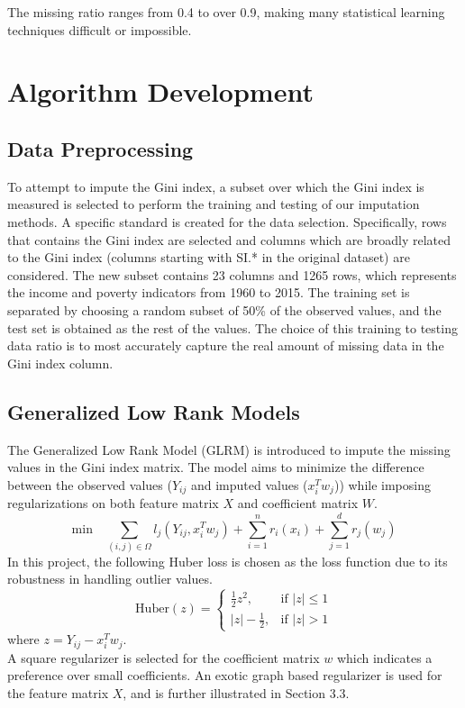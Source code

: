 \documentclass[a4paper]{article}
\begin{document}
The missing ratio ranges from 0.4 to over 0.9, making many statistical learning techniques difficult or impossible.

\section{Algorithm Development}
\subsection{Data Preprocessing}
To attempt to impute the Gini index, a subset over which the Gini index is measured is selected to perform the training and testing of our imputation methods. A specific standard is created for the data selection. Specifically, rows that contains the Gini index are selected and columns which are broadly related to the Gini index (columns starting with SI.* in the original dataset) are considered. The new subset contains 23 columns and 1265 rows, which represents the income and poverty indicators from 1960 to 2015. The training set is separated by choosing a random subset of 50\% of the observed values, and the test set is obtained as the rest of the values. The choice of this training to testing data ratio is to most accurately capture the real amount of missing data in the Gini index column.


\subsection{Generalized Low Rank Models}
The Generalized Low Rank Model (GLRM) is introduced to impute the missing values in the Gini index matrix. The model aims to minimize the difference between the observed values ($Y_{ij}$ and imputed values ($x_i^Tw_j$)) while imposing regularizations on both feature matrix $X$ and coefficient matrix $W$.
\begin{equation*}
\text{min}\quad \sum_{(i,j)\in \Omega}l_j(Y_{ij},x_i^Tw_j)+\sum_{i=1}^nr_i(x_i)+\sum_{j=1}^dr_j(w_j)
\end{equation*}
In this project, the following Huber loss is chosen as the loss function due to its robustness in handling outlier values. 
\begin{equation*}
\text{Huber}(z)=\begin{cases}
\frac{1}{2}z^2,&\text{if $|z|\leq1$}\\
|z|-\frac{1}{2},&\text{if $|z|>1$}
\end{cases}
\end{equation*}
where $z=Y_{ij}-x_i^Tw_j$.\\
A square regularizer is selected for the coefficient matrix $w$ which indicates a preference over small coefficients. An exotic graph based regularizer is used for the feature matrix $X$, and is further illustrated in Section 3.3.
\end{document}
